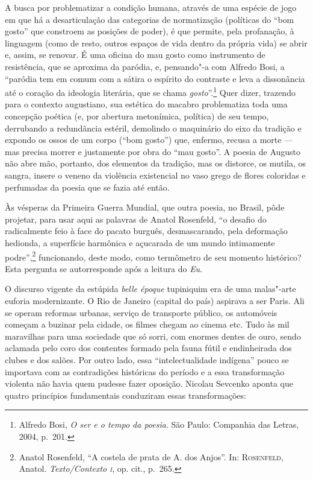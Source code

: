 A busca por problematizar a condição humana, através de uma espécie
de jogo em que há a desarticulação das categorias de normatização
(políticas do “bom gosto” que constroem as posições de poder), é que
permite, pela profanação, à linguagem (como de resto, outros espaços de
vida dentro da própria vida) se abrir e, assim, se renovar. É uma
oficina do mau gosto como instrumento de resistência, que se aproxima da
paródia, e, pensando"-a com Alfredo Bosi, a “paródia tem em comum com a
sátira o espírito do contraste e leva a dissonância até o coração da
ideologia literária, que se chama \textit{gosto}”.\footnote{Alfredo Bosi, \textit{O ser 
e o tempo da poesia}. São Paulo: Companhia das Letras, 2004, p.~201.}
Quer dizer, trazendo para o contexto augustiano, sua estética do
macabro problematiza toda uma concepção poética (e, por abertura
metonímica, política) de seu tempo, derrubando a redundância estéril,
demolindo o maquinário do eixo da tradição e expondo os ossos de um corpo
(“bom gosto”) que, enfermo, recusa a morte --- mas precisa morrer e
justamente por obra do “mau gosto”. A poesia de Augusto não abre mão,
portanto, dos elementos da tradição, mas os distorce, os mutila, os
sangra, insere o veneno da violência existencial no vaso grego de
flores coloridas e perfumadas da poesia que se fazia até então.  

Às vésperas da Primeira Guerra Mundial, que outra poesia, no Brasil,
pôde projetar, para usar aqui as palavras de Anatol Rosenfeld, “o desafio do
radicalmente feio à face do pacato burguês, desmascarando, pela
deformação hedionda, a superfície harmônica e açucarada de um mundo
intimamente podre”,\footnote{Anatol Rosenfeld, “A costela de prata de A. dos Anjos”. In:
\textsc{Rosenfeld}, Anatol. \textit{Texto/Contexto \textsc{i}}, op. cit., 
p.~265.} funcionando, deste modo, como
termômetro de seu momento histórico? Esta pergunta se autorresponde
após a leitura do \textit{Eu}.

O discurso vigente da estúpida \textit{belle époque} tupiniquim era
de uma malas"-arte euforia modernizante. O Rio de Janeiro (capital do
país) aspirava a ser Paris. Ali se operam reformas urbanas, serviço de
transporte público, os automóveis começam a buzinar pela cidade, os
filmes chegam ao cinema etc. Tudo às mil maravilhas para uma sociedade
que só sorri, com enormes dentes de ouro, sendo aclamada pelo coro dos
contentes formado pela fauna fútil e endinheirada dos clubes e dos
salões. Por outro lado, essa “intelectualidade indígena” pouco se
importava com as contradições históricas do período e a essa
transformação violenta não havia quem pudesse fazer oposição. Nicolau
Sevcenko aponta que quatro princípios fundamentais conduziram essas
transformações: 

